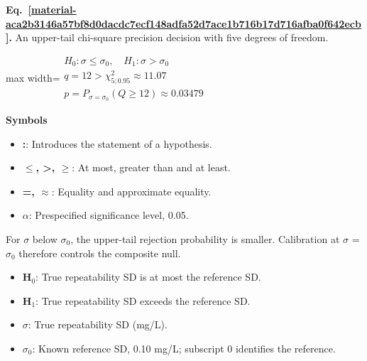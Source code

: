 \documentclass[11pt,a4paper]{article}
\begin{document}
\par\medskip
\noindent\begin{minipage}{\linewidth}
\label{material-aca2b3146a57bf8d0dacdc7ecf148adfa52d7ace1b716b17d716afba0f642ecb}
\noindent\textbf{Eq.~\ref*{material-aca2b3146a57bf8d0dacdc7ecf148adfa52d7ace1b716b17d716afba0f642ecb}.} An upper-tail chi-square precision decision with five degrees of freedom.\par\nopagebreak
\begin{center}\begin{adjustbox}{max width=\linewidth}$\displaystyle \begin{gathered}H_0:\sigma\le\sigma_0,\quad H_1:\sigma>\sigma_0\\q=12>\chi^2_{5;0.95}\approx11.07\\p=P_{\sigma=\sigma_0}(Q\ge12)\approx0.03479\end{gathered}$\end{adjustbox}\end{center}

\par\noindent\textbf{Symbols}

\begin{itemize}\setlength{\itemsep}{1pt}\setlength{\parsep}{0pt}
\item \textbf{:}: Introduces the statement of a hypothesis.
\item \textbf{\ensuremath{\le}, >, \ensuremath{\ge}}: At most, greater than and at least.
\item \textbf{=, \ensuremath{\approx}}: Equality and approximate equality.
\item \textbf{\ensuremath{\alpha}}: Prespecified significance level, 0.05.
\end{itemize}

For \ensuremath{\sigma} below \ensuremath{\sigma}\ensuremath{{}_0}, the upper-tail rejection probability is smaller. Calibration at \ensuremath{\sigma} = \ensuremath{\sigma}\ensuremath{{}_0} therefore controls the composite null.

\begin{itemize}\setlength{\itemsep}{1pt}\setlength{\parsep}{0pt}
\item \textbf{H\ensuremath{{}_0}}: True repeatability SD is at most the reference SD.
\item \textbf{H\ensuremath{{}_1}}: True repeatability SD exceeds the reference SD.
\item \textbf{\ensuremath{\sigma}}: True repeatability SD (mg/L).
\item \textbf{\ensuremath{\sigma}\ensuremath{{}_0}}: Known reference SD, 0.10 mg/L; subscript 0 identifies the reference.
\end{itemize}


\end{minipage}
\end{document}
